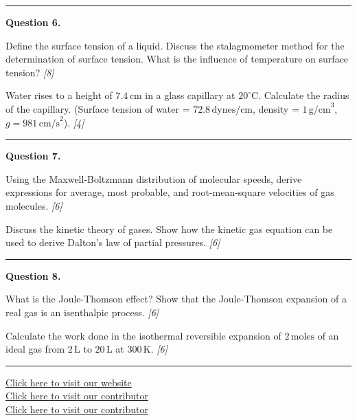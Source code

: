 \documentclass[11pt,a4paper]{article}
\newcommand{\pts}[1]{\hfill   \textit{[#1]}}
\begin{document}
\medskip\rule{\linewidth}{0.2pt}




\noindent   \textbf{Question 6.}

\begin{parts}
  \item Define the surface tension of a liquid. Discuss the stalagmometer method for the determination of surface tension. What is the influence of temperature on surface tension? \pts{8}
  \item Water rises to a height of $7.4\, \text{cm}$ in a glass capillary at $20^\circ \text{C}$. Calculate the radius of the capillary. (Surface tension of water = $72.8\, \text{dynes/cm}$, density = $1\, \text{g/cm}^3$, $g = 981\, \text{cm/s}^2$). \pts{4}
\end{parts}

\medskip\rule{\linewidth}{0.2pt}




\noindent   \textbf{Question 7.}

\begin{parts}
  \item Using the Maxwell-Boltzmann distribution of molecular speeds, derive expressions for average, most probable, and root-mean-square velocities of gas molecules. \pts{6}
  \item Discuss the kinetic theory of gases. Show how the kinetic gas equation can be used to derive Dalton's law of partial pressures. \pts{6}
\end{parts}

\medskip\rule{\linewidth}{0.2pt}




\noindent   \textbf{Question 8.}

\begin{parts}
  \item What is the Joule-Thomson effect? Show that the Joule-Thomson expansion of a real gas is an isenthalpic process. \pts{6}
  \item Calculate the work done in the isothermal reversible expansion of $2\, \text{moles}$ of an ideal gas from $2\, \text{L}$ to $20\, \text{L}$ at $300\, \text{K}$. \pts{6}
\end{parts}

\vfill
\rule{\linewidth}{0.4pt}

\begin{center}\small
  \href{https://bhu-exam.vercel.app/}{Click here to visit our website}\\[4pt]
  \href{https://me-aryan.vercel.app/}{Click here to visit our contributor}\\[4pt]
  \href{https://quashan-me.vercel.app/}{Click here to visit our contributor}
\end{center}
\end{document}

